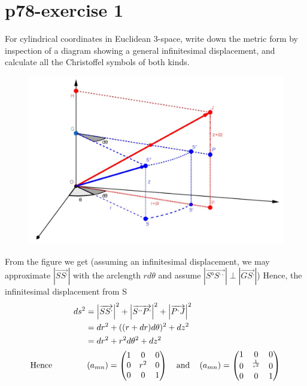 \section{p78-exercise 1}
\begin{tcolorbox}
For cylindrical coordinates in Euclidean 3-space, write down the metric form by inspection of a diagram showing a general infinitesimal displacement, and calculate all the Christoffel symbols of both kinds.
\end{tcolorbox}
\begin{figure}[h]
\centering
\begin{minipage}[t]{.5\textwidth}
\vspace{0pt}
\includegraphics[scale=.4]{polar3d.jpg}
\end{minipage}\hfill
\end{figure}
From the figure we get (assuming an infinitesimal displacement, we may approximate $\left| \overrightarrow{SS^{,}} \right|$ with the arclength $r d\theta$ and assume $\left|  \overrightarrow{S°S^{,,}} \right| \perp \left|  \overrightarrow{GS^{,}} \right|$) Hence, the infinitesimal displacement from S
\begin{align}
\ ds^2 &= \left| \overrightarrow{SS^{,}} \right|^2 + \left| \overrightarrow{S^{,,}P^{,}} \right|^2+\left| \overrightarrow{P^{,}J} \right|^2\\
\ &= dr^2 + ((r+dr)d\theta)^2 + dz^2\\
\ &= dr^2 + r^2d\theta^2 + dz^2\\
\text{Hence} \quad\quad\quad\quad &\left(a_{mn}\right) = \begin{pmatrix}
 1& 0 & 0 \\
 0&  r^2&0  \\
 0&0  &1  \\
\end{pmatrix}\quad\text{and}\quad \left(a_{mn}\right) = \begin{pmatrix}
 1& 0 & 0 \\
 0&  ^\frac{1}{r^2}&0  \\
 0&0  &1  \\
\end{pmatrix}
\end{align}
